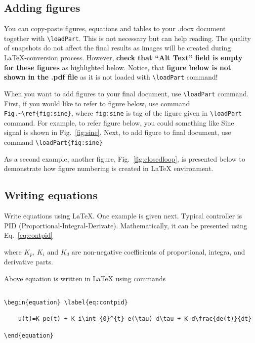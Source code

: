 \subsection{Adding figures}

You can copy-paste figures, equations and tables to your .docx document together with \verb|\loadPart|. This is not
necessary but can help reading. The quality of snapshots do not affect the final results as images will be created
during \LaTeX{}-conversion process. However, \textbf{check that ``Alt Text'' field is empty for these figures} as
highlighted below. Notice, that \textbf{figure below is not shown in the .pdf file} as it is not loaded with
\verb|\loadPart| command!

When you want to add figures to your final document, use \verb|\loadPart| command. First, if you would like to refer to
figure below, use command \verb|Fig.~\ref{fig:sine}|, where \verb|fig:sine| is tag of the figure given in
\verb|\loadPart| command. For example, to refer figure below, you could something like Sine signal is shown in
Fig.~\ref{fig:sine}. Next, to add figure to final document, use command \verb|\loadPart{fig:sine}|


As a second example, another figure, Fig.~\ref{fig:closedloop}, is presented below to demonstrate how
figure numbering is created in \LaTeX{} environment.


\subsection{Writing equations}

Write equations using \LaTeX{}. One example is given next. Typical controller is PID (Proportional-Integral-Derivate).
Mathematically, it can be presented using Eq.~\ref{eq:contpid}


\noindent where \(K_p\), \(K_i\) and \(K_d\) are non-negative coefficients of proportional, integra, and derivative
parts.

Above equation is written in \LaTeX{} using commands

\begin{verbatim}

\begin{equation} \label{eq:contpid}

    u(t)=K_pe(t) + K_i\int_{0}^{t} e(\tau) d\tau + K_d\frac{de(t)}{dt}

\end{equation}

\end{verbatim}


